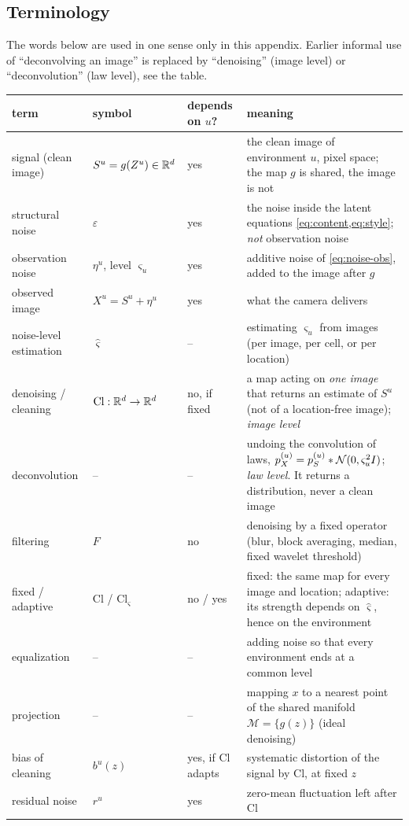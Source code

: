 \subsection{Terminology}
\label{app:noise:terms}
The words below are used in one sense only in this appendix. Earlier informal use of ``deconvolving an
image'' is replaced by ``denoising'' (image level) or ``deconvolution'' (law level), see the table.

\begin{center}
\small
\begin{tabular}{@{}l L{3.4cm} L{1.2cm} L{6.6cm}@{}}
\toprule
term & symbol & depends on $u$? & meaning\\
\midrule
signal (clean image) & $S^u=g(Z^u)\in\mathbb{R}^d$ & yes & the clean image of environment $u$, pixel space; the
map $g$ is shared, the image is not\\
structural noise & $\varepsilon$ & yes & the noise inside the latent equations
\cref{eq:content,eq:style}; \emph{not} observation noise\\
observation noise & $\eta^u$, level $\varsigma_u$ & yes & additive noise of \cref{eq:noise-obs}, added to
the image after $g$\\
observed image & $X^u=S^u+\eta^u$ & yes & what the camera delivers\\
noise-level estimation & $\hat\varsigma$ & -- & estimating $\varsigma_u$ from images (per image, per cell,
or per location)\\
denoising / cleaning & $\mathrm{Cl}:\mathbb{R}^d\to\mathbb{R}^d$ & no, if fixed & a map acting on \emph{one image} that
returns an estimate of $S^u$ (not of a location-free image); \emph{image level}\\
deconvolution & -- & -- & undoing the convolution of laws,\newline
$p^{(u)}_X=p^{(u)}_S*\mathcal{N}(0,\varsigma_u^2I)$; \emph{law level}. It returns a distribution, never a clean
image\\
filtering & $F$ & no & denoising by a fixed operator (blur, block averaging, median, fixed wavelet
threshold)\\
fixed / adaptive & $\mathrm{Cl}$ / $\mathrm{Cl}_{\hat\varsigma}$ & no / yes & fixed: the same map for
every image and location; adaptive: its strength depends on $\hat\varsigma$, hence on the environment\\
equalization & -- & -- & adding noise so that every environment ends at a common level\\
projection & -- & -- & mapping $x$ to a nearest point of the shared manifold $\mathcal M=\{g(z)\}$
(ideal denoising)\\
bias of cleaning & $b^u(z)$ & yes, if $\mathrm{Cl}$ adapts & systematic distortion of the signal by
$\mathrm{Cl}$, at fixed $z$\\
residual noise & $r^u$ & yes & zero-mean fluctuation left after $\mathrm{Cl}$\\
\bottomrule
\end{tabular}
\end{center}

